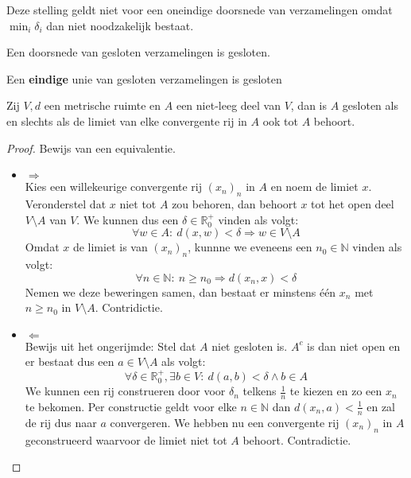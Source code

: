 \documentclass[main.tex]{subfiles}
\begin{document}
\begin{opm}
  Deze stelling geldt niet voor een oneindige doorsnede van verzamelingen omdat $\min_{i}\delta_{i}$ dan niet noodzakelijk bestaat.
\end{opm}

\begin{pr}
  Een doorsnede van gesloten verzamelingen is gesloten.
\end{pr}

\begin{pr}
  Een \textbf{eindige} unie van gesloten verzamelingen is gesloten
\end{pr}

\begin{pr}
  \label{pr:metrische-ruimte-gesloten-itv-rijen}
  Zij $V,d$ een metrische ruimte en $A$ een niet-leeg deel van $V$, dan is $A$ gesloten als en slechts als de limiet van elke convergente rij in $A$ ook tot $A$ behoort.

  \begin{proof}
    Bewijs van een equivalentie.
    \begin{itemize}
    \item $\Rightarrow$\\
      Kies een willekeurige convergente rij $(x_{n})_{n}$ in $A$ en noem de limiet $x$.
      Veronderstel dat $x$ niet tot $A$ zou behoren, dan behoort $x$ tot het open deel $V \setminus A$ van $V$.
      We kunnen dus een $\delta \in \mathbb{R}_{0}^{+}$ vinden als volgt:
      \[ \forall w \in A:\ d(x,w) < \delta \Rightarrow w \in V \setminus A \]
      Omdat $x$ de limiet is van $(x_{n})_{n}$, kunnne we eveneens een $n_{0}\in \mathbb{N}$ vinden als volgt:
      \[ \forall n\in \mathbb{N}:\ n \ge n_{0} \Rightarrow d(x_{n},x) < \delta \]
      Nemen we deze beweringen samen, dan bestaat er minstens \'e\'en $x_{n}$ met $n\ge n_{0}$ in $V \setminus A$.
      Contridictie.
    \item $\Leftarrow$\\
      Bewijs uit het ongerijmde: Stel dat $A$ niet gesloten is.
      $A^{c}$ is dan niet open en er bestaat dus een $a\in V \setminus A$ als volgt:
      \[ \forall \delta \in \mathbb{R}_{0}^{+}, \exists b\in V:\ d(a,b) < \delta \wedge b \in A \]
      We kunnen een rij construeren door voor $\delta_{n}$ telkens $\frac{1}{n}$ te kiezen en zo een $x_{n}$ te bekomen.
      Per constructie geldt voor elke $n\in \mathbb{N}$ dan $d(x_{n},a) < \frac{1}{n}$ en zal de rij dus naar $a$ convergeren.
      We hebben nu een convergente rij $(x_{n})_{n}$ in $A$ geconstrueerd waarvoor de limiet niet tot $A$ behoort.
      Contradictie.
    \end{itemize}
  \end{proof}
\end{pr}
\end{document}

